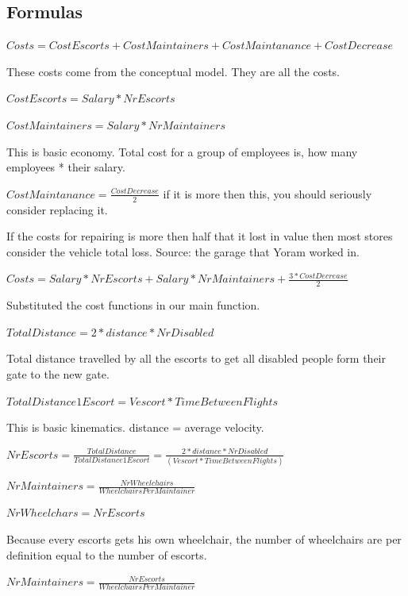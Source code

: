 \documentclass[a4paper, 11pt, notitlepage]{report}
\begin{document}
	\subsection{Formulas}
\begin{description}
	\item $Costs = CostEscorts + CostMaintainers + CostMaintanance + CostDecrease$
	\item[Explanation:] These costs come from the conceptual model. They are all the costs.
	\item $CostEscorts = Salary * NrEscorts$
	\item $CostMaintainers = Salary * NrMaintainers$
	\item[Explanation:] This is basic economy. Total cost for a group of employees is, how many employees * their salary.
	\item $CostMaintanance = \frac{CostDecrease}{2} $ if it is more then this, you should seriously consider replacing it.
	\item[Explanation:] If the costs for repairing is more then half that it lost in value then most stores consider the vehicle total loss. Source: the garage that Yoram worked in.
	\item
	\item $Costs = Salary * NrEscorts + Salary * NrMaintainers + \frac{3* CostDecrease}{2}$
	\item[Explanation:] Substituted the cost functions in our main function.
	\item $TotalDistance = 2*distance*NrDisabled$
	\item[Explanation:] Total distance travelled by all the escorts to get all disabled people form their gate to the new gate.
	\item $TotalDistance1Escort = Vescort*TimeBetweenFlights$
	\item[Explanation:] This is basic kinematics. distance = average velocity.
	\item $NrEscorts = \frac{TotalDistance}{TotalDistance1Escort} = \frac{2*distance*NrDisabled}{(Vescort*TimeBetweenFlights)}$
	\item
	\item $NrMaintainers = \frac{NrWheelchairs}{WheelchairsPerMaintainer}$
	\item $NrWheelchars = NrEscorts$
	\item[Explanation:] Because every escorts gets his own wheelchair, the number of wheelchairs are per definition equal to the number of escorts.
	\item $NrMaintainers = \frac{NrEscorts}{WheelchairsPerMaintainer}$

\end{description}
\end{document}
